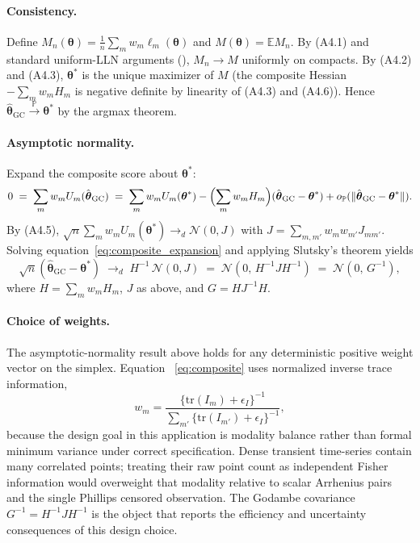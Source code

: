\documentclass[12pt]{article}
\theoremstyle{plain}
\theoremstyle{definition}
\theoremstyle{remark}
\newcommand{\E}{\mathbb{E}}
\newcommand{\norm}[1]{\lVert #1 \rVert}
\begin{document}
\paragraph{Consistency.}  Define
$M_n(\boldsymbol\theta)=\frac{1}{n}\sum_m w_m\ell_m(\boldsymbol\theta)$
and $M(\boldsymbol\theta)=\E M_n$.  By (A4.1) and standard uniform-LLN
arguments (\citet[Lemma~2.4]{Newey1994}), $M_n\to M$ uniformly on
compacts.  By (A4.2) and (A4.3), $\boldsymbol\theta^*$ is the unique
maximizer of $M$ (the composite Hessian $-\sum_m w_m H_m$ is negative
definite by linearity of (A4.3) and (A4.6)).  Hence
$\hat{\boldsymbol\theta}_{\mathrm{GC}}\xrightarrow{\mathbb{P}}\boldsymbol\theta^*$
by the argmax theorem.

\paragraph{Asymptotic normality.}  Expand the composite score about
$\boldsymbol\theta^*$:
\begin{equation}\label{eq:composite_expansion}
   0 \;=\; \sum_m w_m U_m(\hat{\boldsymbol\theta}_{\mathrm{GC}})
     \;=\; \sum_m w_m U_m(\boldsymbol\theta^*)
     - \Bigl(\sum_m w_m H_m\Bigr)(\hat{\boldsymbol\theta}_{\mathrm{GC}}-\boldsymbol\theta^*)
     + o_{\mathbb{P}}(\norm{\hat{\boldsymbol\theta}_{\mathrm{GC}}-\boldsymbol\theta^*}).
\end{equation}
By (A4.5), $\sqrt{n}\sum_m w_m U_m(\boldsymbol\theta^*)\to_d
\mathcal{N}(0,J)$ with $J=\sum_{m,m'}w_m w_{m'}J_{mm'}$.  Solving
equation~\eqref{eq:composite_expansion} and applying Slutsky's theorem
yields
\[
   \sqrt{n}(\hat{\boldsymbol\theta}_{\mathrm{GC}}-\boldsymbol\theta^*)
    \;\to_d\; H^{-1}\,\mathcal{N}(0,J)
    \;=\;\mathcal{N}(0,\,H^{-1}JH^{-1})
    \;=\;\mathcal{N}(0,\,G^{-1}),
\]
where $H=\sum_m w_m H_m$, $J$ as above, and $G=HJ^{-1}H$.

\paragraph{Choice of weights.}  The asymptotic-normality result above holds
for any deterministic positive weight vector on the simplex.  Equation
~\eqref{eq:composite} uses normalized inverse trace information,
\[
   w_m =
  \frac{\{\mathrm{tr}(I_m)+\epsilon_I\}^{-1}}
       {\sum_{m'}\{\mathrm{tr}(I_{m'})+\epsilon_I\}^{-1}},
\]
because the design goal in this application is modality balance rather than
formal minimum variance under correct specification.  Dense transient
time-series contain many correlated points; treating their raw point count as
independent Fisher information would overweight that modality relative to
scalar Arrhenius pairs and the single Phillips censored observation.  The
Godambe covariance $G^{-1}=H^{-1}JH^{-1}$ is the object that reports the
efficiency and uncertainty consequences of this design choice.
\end{document}

